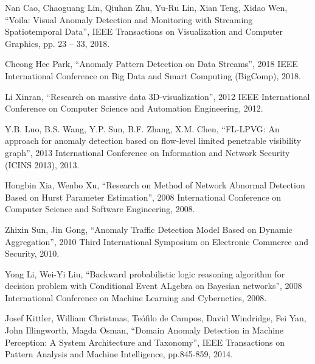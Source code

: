 \begin{thebibliography}{99}
		Nan Cao, Chaoguang Lin, Qiuhan Zhu, Yu-Ru Lin, Xian Teng, Xidao Wen, “Voila: Visual Anomaly Detection and Monitoring with Streaming Spatiotemporal Data”, IEEE Transactions on Visualization and Computer Graphics, pp. 23 – 33, 2018.
		
		Cheong Hee Park, “Anomaly Pattern Detection on Data Streams”, 2018 IEEE International Conference on Big Data and Smart Computing (BigComp), 2018.
		
		Li Xinran, “Research on massive data 3D-visualization”, 2012 IEEE International Conference on Computer Science and Automation Engineering, 2012.
		
		Y.B. Luo, B.S. Wang, Y.P. Sun, B.F. Zhang, X.M. Chen, “FL-LPVG: An approach for anomaly detection based on flow-level limited penetrable visibility graph”, 2013 International Conference on Information and Network Security (ICINS 2013), 2013.
		
		Hongbin Xia, Wenbo Xu, “Research on Method of Network Abnormal Detection Based on Hurst Parameter Estimation”, 2008 International Conference on Computer Science and Software Engineering, 2008.
		
		Zhixin Sun, Jin Gong, “Anomaly Traffic Detection Model Based on Dynamic Aggregation”, 2010 Third International Symposium on Electronic Commerce and Security, 2010.
		
		Yong Li, Wei-Yi Liu, “Backward probabilistic logic reasoning algorithm for decision problem with Conditional Event ALgebra on Bayesian networks”, 2008 International Conference on Machine Learning and Cybernetics, 2008.
		
		Josef Kittler, William Christmas, Teófilo de Campos, David Windridge, Fei Yan, John Illingworth, Magda Osman, “Domain Anomaly Detection in Machine Perception: A System Architecture and Taxonomy”, IEEE Transactions on Pattern Analysis and Machine Intelligence, pp.845-859, 2014.

		
	\end{thebibliography}